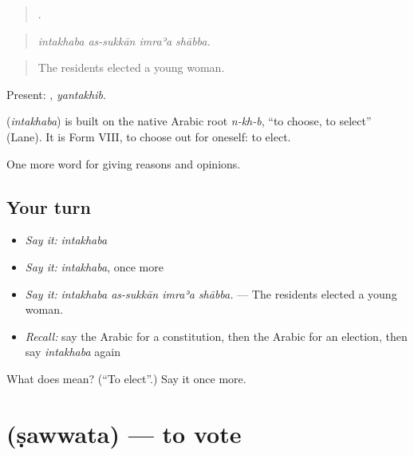 \begin{quote}
   .
\end{quote}

\begin{quote}
\emph{intakhaba as-sukkān imraʾa shābba.}
\end{quote}

\begin{quote}
The residents elected a young woman.
\end{quote}

Present: , \emph{yantakhib}.

\begin{cousinweb}
\textbf{} (\emph{intakhaba}) is built on the native Arabic root \emph{n-kh-b}, \textquotedblleft{}to choose, to select\textquotedblright{} (Lane). It is Form VIII, to choose out for oneself: to elect.
\end{cousinweb}

\begin{grammarlens}[title={What you've built}]
One more word for giving reasons and opinions.
\end{grammarlens}

\subsection*{Your turn}
\begin{itemize}
\raggedright
  \item \emph{Say it:} \emph{intakhaba}
  \item \emph{Say it:} \emph{intakhaba}, once more
  \item \emph{Say it:} \emph{intakhaba as-sukkān imraʾa shābba.} — The residents elected a young woman.
  \item \emph{Recall:} say the Arabic for a constitution, then the Arabic for an election, then say \emph{intakhaba} again
\end{itemize}

\begin{tcolorbox}[breakable,colback=teal!4,colframe=teal!35!black,title={Before you move on}]
What does  mean? (\textquotedblleft{}To elect\textquotedblright{}.) Say it once more.
\end{tcolorbox}
\section[\texorpdfstring{\ar{صوت} (ṣawwata)}{صوت (ṣawwata)}]{ (ṣawwata) — to vote}

